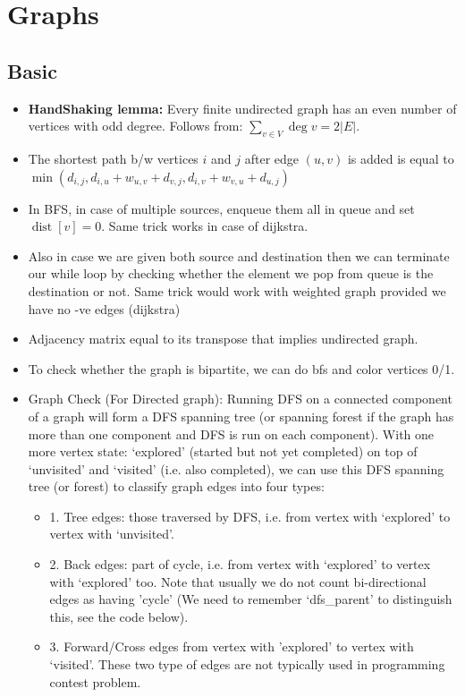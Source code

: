 \documentclass[8pt, a4paper, oneside, twocolumn]{extarticle}
\DeclareMathOperator{\dist}{dist}
\begin{document}
\section{Graphs}
\subsection{Basic}
\begin{itemize}
    \item \textbf{HandShaking lemma:} Every finite undirected graph has an even number of vertices with odd degree. Follows from: $\sum _{v\in V}\deg v=2|E|$.    
    \item The shortest path b/w vertices $i$ and $j$ after edge $(u, v)$ is added is equal to $\min(d_{i, j}, d_{i, u} + w_{u, v} + d_{v, j}, d_{i, v} + w_{v, u} + d_{u, j})$
    \item In BFS, in case of multiple sources, enqueue them all in queue and set $\dist[v] = 0$. Same trick works in case of dijkstra.
    \item Also in case we are given both source and destination then we can terminate our while loop by checking whether the element we pop from queue is the destination or not. Same trick would work with weighted graph provided we have no -ve edges (dijkstra)
    \item Adjacency matrix equal to its transpose that implies undirected graph.
    \item To check whether the graph is bipartite, we can do bfs and color vertices 0/1.
    \item Graph Check (For Directed graph): Running DFS on a connected component of a graph will form a DFS spanning tree (or spanning forest if the graph has more than one component and DFS is run on each component). With one
    more vertex state: `explored' (started but not yet completed) on top of `unvisited' and `visited' (i.e. also completed), we can use this DFS spanning tree (or forest) to classify graph edges into four types:
    \begin{itemize}
        \item 1. Tree edges: those traversed by DFS, i.e. from vertex with `explored' to vertex with `unvisited'.
        \item 2. Back edges: part of cycle, i.e. from vertex with `explored' to vertex with `explored' too. Note that usually we do not count bi-directional edges as having 'cycle' (We need to remember `dfs\_parent' to distinguish this, see the code below).
        \item 3. Forward/Cross edges from vertex with 'explored' to vertex with `visited'.
        These two type of edges are not typically used in programming contest problem.
    \end{itemize}
    

\end{itemize}
\end{document}
